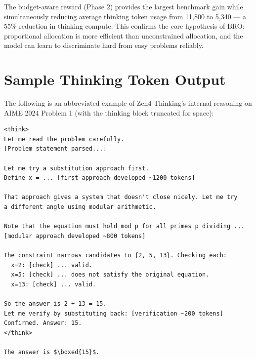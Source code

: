 \documentclass[11pt,a4paper]{article}
\begin{document}
The budget-aware reward (Phase 2) provides the largest benchmark gain while simultaneously
reducing average thinking token usage from 11,800 to 5,340 --- a 55\% reduction in thinking
compute. This confirms the core hypothesis of BRO: proportional allocation is more efficient
than unconstrained allocation, and the model can learn to discriminate hard from easy
problems reliably.

\section{Sample Thinking Token Output}

The following is an abbreviated example of Zen4-Thinking's internal reasoning on AIME 2024
Problem 1 (with the thinking block truncated for space):

\begin{lstlisting}[caption=Abbreviated Thinking Block Example (AIME 2024 P1)]
<think>
Let me read the problem carefully.
[Problem statement parsed...]

Let me try a substitution approach first.
Define x = ... [first approach developed ~1200 tokens]

That approach gives a system that doesn't close nicely. Let me try
a different angle using modular arithmetic.

Note that the equation must hold mod p for all primes p dividing ...
[modular approach developed ~800 tokens]

The constraint narrows candidates to {2, 5, 13}. Checking each:
  x=2: [check] ... valid.
  x=5: [check] ... does not satisfy the original equation.
  x=13: [check] ... valid.

So the answer is 2 + 13 = 15.
Let me verify by substituting back: [verification ~200 tokens]
Confirmed. Answer: 15.
</think>

The answer is $\boxed{15}$.
\end{lstlisting}
\end{document}
